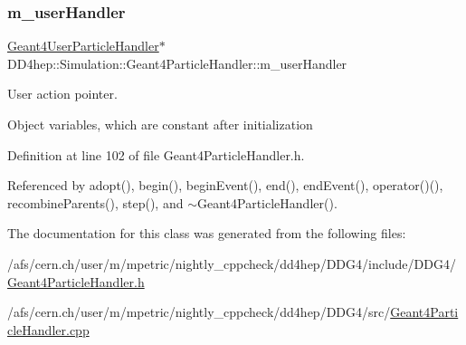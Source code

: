 \hypertarget{class_d_d4hep_1_1_simulation_1_1_geant4_particle_handler_a6614f131fd012f3e1aa7f13576baf256}{}\label{class_d_d4hep_1_1_simulation_1_1_geant4_particle_handler_a6614f131fd012f3e1aa7f13576baf256} 
\subsubsection{\texorpdfstring{m\+\_\+user\+Handler}{m\_userHandler}}
{\footnotesize\ttfamily \hyperlink{class_d_d4hep_1_1_simulation_1_1_geant4_user_particle_handler}{Geant4\+User\+Particle\+Handler}$\ast$ D\+D4hep\+::\+Simulation\+::\+Geant4\+Particle\+Handler\+::m\+\_\+user\+Handler\hspace{0.3cm}{\ttfamily [protected]}}



User action pointer. 

Object variables, which are constant after initialization 

Definition at line 102 of file Geant4\+Particle\+Handler.\+h.



Referenced by adopt(), begin(), begin\+Event(), end(), end\+Event(), operator()(), recombine\+Parents(), step(), and $\sim$\+Geant4\+Particle\+Handler().



The documentation for this class was generated from the following files\+:\begin{DoxyCompactItemize}
\item 
/afs/cern.\+ch/user/m/mpetric/nightly\+\_\+cppcheck/dd4hep/\+D\+D\+G4/include/\+D\+D\+G4/\hyperlink{_geant4_particle_handler_8h}{Geant4\+Particle\+Handler.\+h}\item 
/afs/cern.\+ch/user/m/mpetric/nightly\+\_\+cppcheck/dd4hep/\+D\+D\+G4/src/\hyperlink{_geant4_particle_handler_8cpp}{Geant4\+Particle\+Handler.\+cpp}\end{DoxyCompactItemize}
